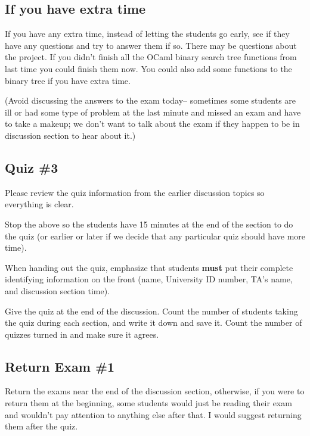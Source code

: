 \documentclass[12pt]{article}
\begin{document}
      \vspace{-2.5mm}

    \subsection{If you have extra time}

      If you have any extra time, instead of letting the students go early,
    see if they have any questions and try to answer them if so.  There may
    be questions about the project.  If you didn't finish all the OCaml
    binary search tree functions from last time you could finish them now.
    You could also add some functions to the binary tree if you have extra
    time.

      (Avoid discussing the answers to the exam today-- sometimes some students
    are ill or had some type of problem at the last minute and missed an
    exam and have to take a makeup; we don't want to talk about the exam if
    they happen to be in discussion section to hear about it.)

    \subsection{Quiz \#3}

      Please review the quiz information from the earlier discussion topics
    so everything is clear.

      Stop the above so the students have 15 minutes at the end of the section
    to do the quiz (or earlier or later if we decide that any particular
    quiz should have more time).

      When handing out the quiz, emphasize that students \textbf{must} put
    their complete identifying information on the front (name, University ID
    number, TA's name, and discussion section time).

      Give the quiz at the end of the discussion.  Count the number of
    students taking the quiz during each section, and write it down and save
    it.  Count the number of quizzes turned in and make sure it agrees.

    \subsection{Return Exam \#1}

      Return the exams near the end of the discussion section, otherwise, if
    you were to return them at the beginning, some students would just be
    reading their exam and wouldn't pay attention to anything else after
    that.  I would suggest returning them after the quiz.
\end{document}
